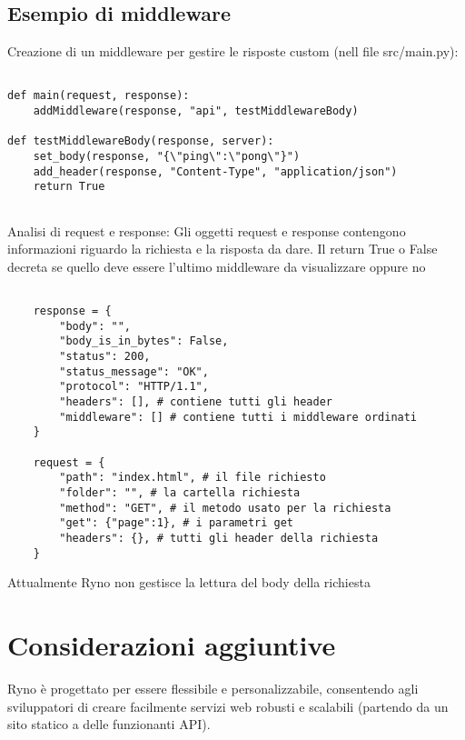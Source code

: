 \documentclass{article}
\begin{document}
\subsection{Esempio di middleware}
Creazione di un middleware per gestire le risposte custom (nell file src/main.py):
\begin{lstlisting}
    
def main(request, response):
    addMiddleware(response, "api", testMiddlewareBody)

def testMiddlewareBody(response, server):
    set_body(response, "{\"ping\":\"pong\"}")
    add_header(response, "Content-Type", "application/json")
    return True
    
\end{lstlisting}
Analisi di request e response:
Gli oggetti request e response contengono informazioni riguardo la richiesta e la risposta da dare.
Il return True o False decreta se quello deve essere l'ultimo middleware da visualizzare oppure no
\begin{lstlisting}
    
    response = {
        "body": "",
        "body_is_in_bytes": False,
        "status": 200,
        "status_message": "OK",
        "protocol": "HTTP/1.1",
        "headers": [], # contiene tutti gli header
        "middleware": [] # contiene tutti i middleware ordinati  
    }

    request = {
        "path": "index.html", # il file richiesto
        "folder": "", # la cartella richiesta
        "method": "GET", # il metodo usato per la richiesta
        "get": {"page":1}, # i parametri get
        "headers": {}, # tutti gli header della richiesta
    }
\end{lstlisting}
Attualmente Ryno non gestisce la lettura del body della richiesta
\section{Considerazioni aggiuntive}
Ryno è progettato per essere flessibile e personalizzabile, consentendo agli sviluppatori di creare facilmente servizi web robusti e scalabili (partendo da un sito statico a delle funzionanti API).
\end{document}
